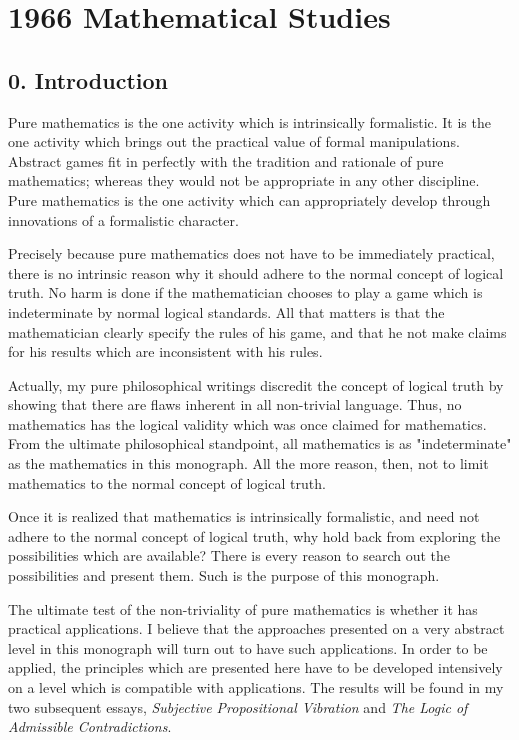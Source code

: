 \documentclass[10pt,twoside,draft]{memoir}
\newcommand{\essaytitle}[1]{
	\emph{#1}}
\begin{document}
{\chapter{1966 Mathematical Studies}

\section*{0. Introduction}

Pure mathematics is the one activity which is intrinsically formalistic. It 
is the one activity which brings out the practical value of formal 
manipulations. Abstract games fit in perfectly with the tradition and 
rationale of pure mathematics; whereas they would not be appropriate in 
any other discipline. Pure mathematics is the one activity which can 
appropriately develop through innovations of a formalistic character. 

Precisely because pure mathematics does not have to be immediately 
practical, there is no intrinsic reason why it should adhere to the normal 
concept of logical truth. No harm is done if the mathematician chooses to 
play a game which is indeterminate by normal logical standards. All that 
matters is that the mathematician clearly specify the rules of his game, and 
that he not make claims for his results which are inconsistent with his rules. 

Actually, my pure philosophical writings discredit the concept of 
logical truth by showing that there are flaws inherent in all non-trivial 
language. Thus, no mathematics has the logical validity which was once 
claimed for mathematics. From the ultimate philosophical standpoint, all 
mathematics is as "indeterminate" as the mathematics in this monograph. 
All the more reason, then, not to limit mathematics to the normal concept 
of logical truth. 

Once it is realized that mathematics is intrinsically formalistic, and need 
not adhere to the normal concept of logical truth, why hold back from 
exploring the possibilities which are available? There is every reason to 
search out the possibilities and present them. Such is the purpose of this 
monograph. 

The ultimate test of the non-triviality of pure mathematics is whether it 
has practical applications. I believe that the approaches presented on a very 
abstract level in this monograph will turn out to have such applications. In 
order to be applied, the principles which are presented here have to be 
developed intensively on a level which is compatible with applications. The 
results will be found in my two subsequent essays, \essaytitle{Subjective Propositional 
Vibration} and \essaytitle{The Logic of Admissible Contradictions}.

}
\end{document}
